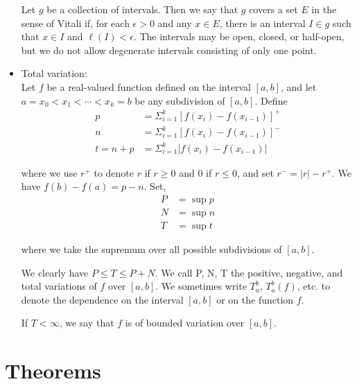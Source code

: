 \documentclass[12pt]{article}
\begin{document}
\begin{itemize}
Let $g$ be a collection of intervals. Then we say that $g$ covers a set $E$ in the sense of Vitali if, for each $\epsilon > 0$ and any $x \in E$, there is an interval $I \in g$ such that $x \in I$ and $\ell(I) < \epsilon$. The intervals may be open, closed, or half-open, but we do not allow degenerate intervals consisting of only one point.
\\
\item Total variation:\\

Let $f$ be a real-valued function defined on the interval $[a, b]$, and let $a = x_0 < x_1 < \cdots < x_k = b$ be any subdivision of $[a, b]$. Define 
\begin{align*}
p &= \Sigma_{i=1}^k [f(x_i) - f(x_{i-1})]^+\\
n &= \Sigma_{i=1}^k [f(x_i) - f(x_{i-1})]^-\\
t = n + p &= \Sigma_{i=1}^k |f(x_i) - f(x_{i-1})|
\end{align*}

where we use $r^+$ to denote $r$ if $r \geq 0$ and $0$ if $r \leq 0$, and set $r^- = |r| - r^+$. We have $f(b) - f(a) = p - n$. Set,
\begin{align*}
P &= \sup p\\
N &= \sup n\\
T &= \sup t
\end{align*}

where we take the supremum over all possible subdivisions of $[a, b]$.

We clearly have $P \leq T \leq P+N$. We call P, N, T the positive, negative, and total variations of $f$ over $[a, b]$. We sometimes write $T_a^b$, $T_a^b(f)$, etc. to denote the dependence on the interval $[a, b]$ or on the function $f$.

If $T < \infty$, we say that $f$ is of bounded variation over $[a, b]$.
\end{itemize}

\newpage
\section{Theorems}
\end{document}
